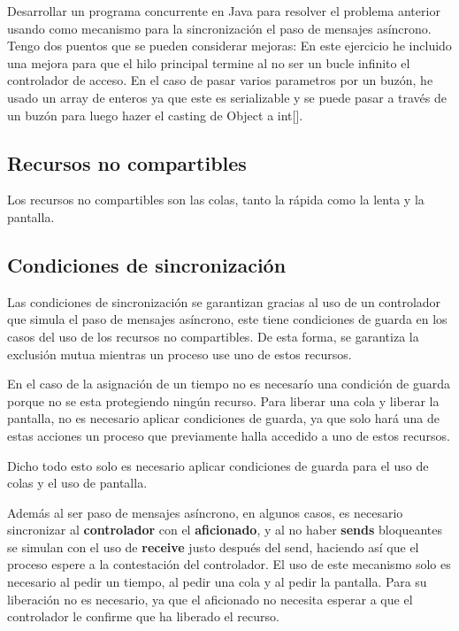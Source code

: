 \documentclass[a4paper,12pt,titlepage,oneside]{article}
\begin{document}
    Desarrollar un programa concurrente en Java para resolver el problema anterior usando como 
    mecanismo para la sincronización el paso de mensajes asíncrono.
    \fi
    Tengo dos puentos que se pueden considerar mejoras:
    En este ejercicio he incluido una mejora para que el hilo principal termine al no ser un bucle infinito el controlador de acceso.
    En el caso de pasar varios parametros por un buzón, he usado un array de enteros ya que este es serializable y se puede pasar a 
    través de un buzón para luego hazer el casting de Object a int[].

    \subsection{Recursos no compartibles}
    Los recursos no compartibles son las colas, tanto la rápida como la lenta y la 
    pantalla.
    \subsection{Condiciones de sincronización}
    Las condiciones de sincronización se garantizan gracias al uso de un 
    controlador que simula el paso de mensajes asíncrono, este tiene condiciones
    de guarda en los casos del uso de los recursos no compartibles.
    De esta forma, se garantiza la exclusión mutua mientras un proceso use uno de 
    estos recursos.

    En el caso de la asignación de un tiempo no es necesarío una condición de 
    guarda porque no se esta protegiendo ningún recurso. Para liberar una cola y 
    liberar la pantalla, no es necesario aplicar condiciones de guarda, ya que 
    solo hará una de estas acciones un proceso que previamente halla accedido a 
    uno de estos recursos.

    Dicho todo esto solo es necesario aplicar condiciones de guarda para el uso
    de colas y el uso de pantalla.

    Además al ser paso de mensajes asíncrono, en algunos casos, es necesario 
    sincronizar al \textbf{controlador} con el \textbf{aficionado}, y al no haber
    \textbf{sends} bloqueantes se simulan con el uso de \textbf{receive} justo después
    del send, haciendo así que el proceso espere a la contestación del controlador.
    El uso de este mecanismo solo es necesario al pedir un tiempo, al pedir una cola y
    al pedir la pantalla. Para su liberación no es necesario, ya que el aficionado no 
    necesita esperar a que el controlador le confirme que ha liberado el recurso.
    \newpage
\end{document}
